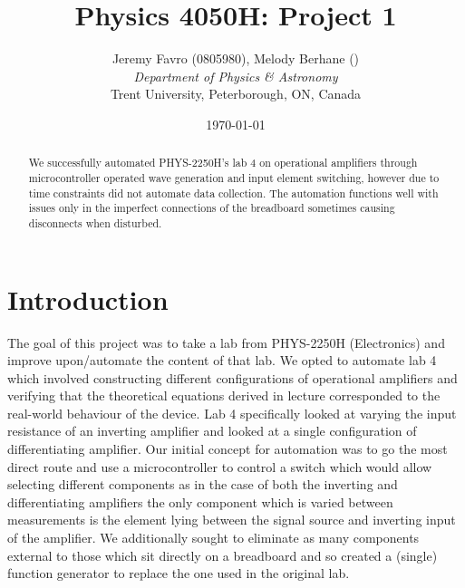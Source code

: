 \documentclass[10pt]{article}
\title{Physics 4050H: Project 1}
\author{Jeremy Favro (0805980), Melody Berhane () \\\emph{Department of Physics \& Astronomy}\\ Trent University, Peterborough, ON, Canada}
\date{\today}
\theoremstyle{definition}
\begin{document}
\maketitle
\listoftodos

\begin{abstract}
  We successfully automated PHYS-2250H's lab 4 on operational amplifiers through microcontroller operated
  wave generation and input element switching, however due to time constraints did not automate data collection.
  The automation functions well with issues only in the imperfect connections of the breadboard sometimes causing
  disconnects when disturbed.
\end{abstract}
\section{Introduction}
The goal of this project was to take a lab from PHYS-2250H (Electronics) and improve upon/automate the content of that lab. We opted to
automate lab 4 which involved constructing different configurations of operational amplifiers and verifying that the theoretical equations
derived in lecture corresponded to the real-world behaviour of the device. Lab 4 specifically looked at varying the input resistance of an
inverting amplifier and looked at a single configuration of differentiating amplifier. Our initial concept for automation was to go the most direct route
and use a microcontroller to control a switch which would allow selecting different components as in the case of both the inverting and differentiating amplifiers
the only component which is varied between measurements is the element lying between the signal source and inverting input of the amplifier. We additionally
sought to eliminate as many components external to those which sit directly on a breadboard and so created a (single) function generator to replace the one used in the original lab.
\newpage
\end{document}
